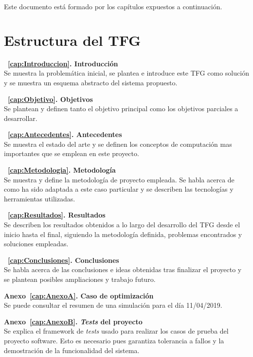 Este documento está formado por los capítulos expuestos a continuación.

\section{Estructura del TFG}
\begin{description}
\item \textbf{~\ref{cap:Introduccion}. Introducción}\\
  Se muestra la problemática inicial, se plantea e introduce este \gls{TFG} como solución y se muestra un esquema abstracto del sistema propuesto.
\item \textbf{~\ref{cap:Objetivo}. Objetivos}\\
  Se plantean y definen tanto el objetivo principal como los objetivos parciales a desarrollar.
\item \textbf{~\ref{cap:Antecedentes}. Antecedentes}\\
  Se muestra el estado del arte y se definen los conceptos de computación mas importantes que se emplean en este proyecto.
\item \textbf{~\ref{cap:Metodologia}. Metodología}\\
  Se muestra y define la metodología de proyecto empleada. Se habla acerca de como ha sido adaptada a este caso particular y se describen las tecnologías y herramientas utilizadas.
\item \textbf{~\ref{cap:Resultados}. Resultados}\\
  Se describen los resultados obtenidos a lo largo del desarrollo del \gls{TFG} desde el inicio hasta el final, siguiendo la metodología definida, problemas encontrados y soluciones empleadas.
\item \textbf{~\ref{cap:Conclusiones}. Conclusiones}\\
  Se habla acerca de las conclusiones e ideas obtenidas tras finalizar el proyecto y se plantean posibles ampliaciones y trabajo futuro.
\item \textbf{Anexo~\ref{cap:AnexoA}. Caso de optimización}\\
  Se puede consultar el resumen de una simulación para el día 11/04/2019.
\item \textbf{Anexo~\ref{cap:AnexoB}. \textit{Tests} del proyecto}\\
  Se explica el framework de \textit{tests} usado para realizar los casos de prueba del proyecto software. Esto es necesario pues garantiza tolerancia a fallos y la demostración de la funcionalidad del sistema.
\end{description}
